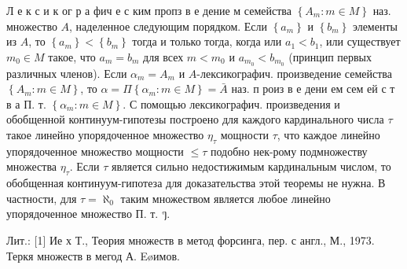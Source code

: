 \documentclass[10pt]{article}
\begin{document}
Л е к с и к ог р а фич е с ким пропз в е дение м семейства $\left\{A_{m}: m \in M\right\}$ наз. множество $A$, наделенное следующим порядком. Если $\left\{a_{m}\right\}$ и $\left\{b_{m}\right\}$ элементы из $A$, то $\left\{a_{m}\right\}<\left\{b_{m}\right\}$ тогда и только тогда, когда или $a_{1}<b_{1}$, или существует $m_{0} \in M$ такое, что $a_{m}=b_{m}$ для всех $m<m_{0}$ и $a_{m_{0}}<b_{m_{0}}$ (принцип первых различных членов). Если $\alpha_{m}=A_{m}$ и $A$-лексикографич. произведение семейства $\left\{A_{m}: m \in M\right\}$, то $\alpha=\Pi\left\{\alpha_{m}: m \in M\right\}=\bar{A}$ наз. п роиз в е дени ем сем ей с т в а П. т. $\left\{\alpha_{m}: m \in M\right\}$. С помощью лексикографич. произведения и обобщенной континуум-гипотезы построено для каждого кардинального числа $\tau$ такое линейно упорядоченное множество $\eta_{\tau}$ мощности $\tau$, что каждое линейно упорядоченное множество мощности $\leqslant \tau$ подобно нек-рому подмножеству множества $\eta_{\tau}$. Если $\tau$ является сильно недостижимым кардинальным числом, то обобщенная континуум-гипотеза для доказательства этой теоремы не нужна. В частности, для $\tau=\aleph_{0}$ таким множеством является любое линейно упорядоченное множество П. т. ๆ.



Лит.: [1] Ие х Т., Теория множеств в метод форсинга, пер. с англ., М., 1973. Теркя множеств в мегод А. Eøимов.
\end{document}
